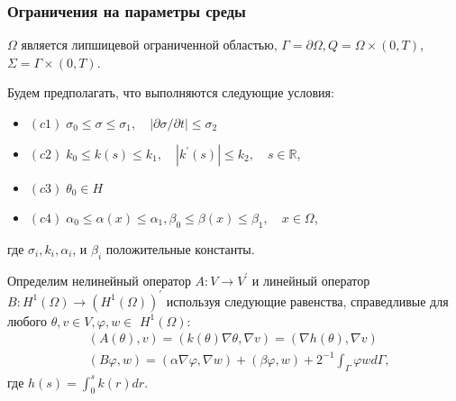 \begin{frame}
    \frametitle{Ограничения на параметры среды}
    $\Omega$ является липшицевой ограниченной областью, $\Gamma=\partial \Omega, Q=\Omega \times(0, T)$, $\Sigma=\Gamma \times(0, T)$.

    Будем предполагать, что выполняются следующие условия:
    \begin{itemize}
        \item $(c1)\; \sigma_{0} \leq \sigma \leq \sigma_{1}, \quad|\partial \sigma / \partial t| \leq \sigma_{2}$

        \item $(c2)\; k_{0} \leq k(s) \leq k_{1}, \quad\left|k^{\prime}(s)\right| \leq k_{2}, \quad s \in \mathbb{R}$,

        \item $(c3)\; \theta_{0} \in H$

        \item $(c4)\; \alpha_{0} \leq \alpha(x) \leq \alpha_{1}, \beta_{0} \leq \beta(x) \leq \beta_{1}, \quad x \in \Omega$,
    \end{itemize}
    где $\sigma_{i}, k_{i}, \alpha_{i}$, и $\beta_{i}$ положительные константы.

    Определим нелинейный оператор $A: V \rightarrow V^{\prime}$ и линейный оператор
    $B: H^{1}(\Omega) \rightarrow\left(H^{1}(\Omega)\right)^{\prime}$
    используя следующие равенства, справедливые для любого
    $\theta, v \in V, \varphi, w \in$ $H^{1}(\Omega)$:
    \[
        \begin{aligned}
            &(A(\theta), v)=(k(\theta) \nabla \theta, \nabla v)=(\nabla h(\theta), \nabla v) \\
            &(B \varphi, w)=(\alpha \nabla \varphi, \nabla w)+(\beta \varphi, w)+2^{-1}
            \int_{\Gamma} \varphi w d \Gamma,
        \end{aligned}
    \]
    где $h(s)=\int_{0}^{s} k(r) d r$.
\end{frame}

